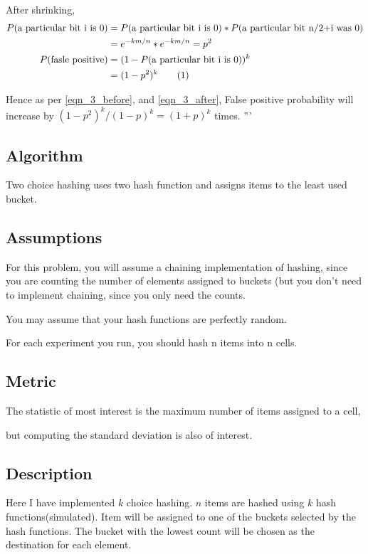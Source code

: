 \documentclass{homeworg}
\let\Oldsubsection\subsection
\renewcommand{\subsection}{\FloatBarrier\Oldsubsection}
\newcommand\numberthis{\addtocounter{equation}{1}\tag{\theequation}}
\begin{document}
After shrinking, 
\begin{align*}
    P(\text{a particular bit i is 0}) &= P(\text{a particular bit i is 0}) \ast P(\text{a particular bit n/2+i was 0})  \\
    &= e^{-km/n} \ast e^{-km/n} = p^2\\
    P(\text{fasle positive}) &= (1-P(\text{a particular bit i is 0}))^k\\
    &= (1-p^2)^k\numberthis\label{eqn_3_after}
\end{align*}

Hence as per \ref{eqn_3_before}, and \ref{eqn_3_after},
False positive probability will increase by $(1-p^2)^k/ (1-p)^k = (1+p)^k$ times. 
\newpage
\exercise
'''
\subsection{Algorithm}
Two choice hashing uses two hash function and assigns items to the least used bucket. 

\subsection{Assumptions}
For this problem, you will assume a chaining implementation of hashing, since you are counting the number of elements assigned to buckets (but you don’t need to implement chaining, since you only need the counts.


You may assume that your hash functions are perfectly random. 

For each experiment you run, you should hash n items into n cells. 

\subsection{Metric}
The statistic of most interest is the maximum number of items assigned to a cell, 

but computing the standard deviation is also of interest.

\subsection{Description}
Here I have implemented $k$ choice hashing. $n$ items are hashed using $k$ hash functions(simulated). Item will be assigned to one of the buckets selected by the hash functions. The bucket with the lowest count will be chosen as the destination for each element.
\end{document}

